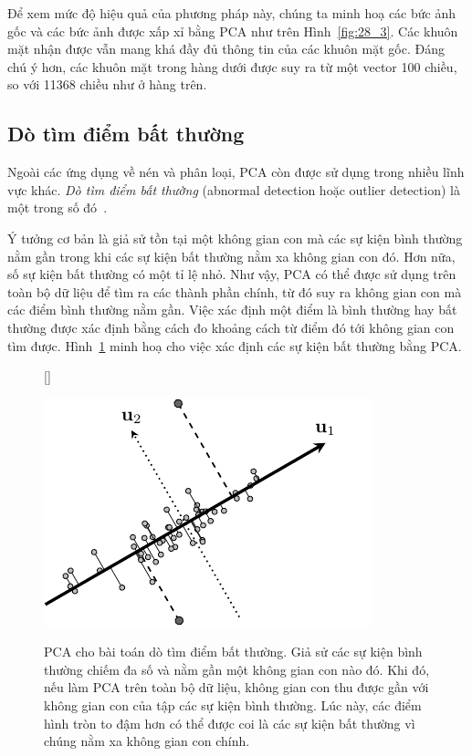 Để xem mức độ hiệu quả của phương pháp này, chúng ta  minh hoạ các bức ảnh gốc và các bức ảnh được xấp xỉ bằng PCA như trên
Hình~\ref{fig:28_3}. Các khuôn mặt nhận được vẫn mang khá đầy đủ thông tin của
các khuôn mặt gốc. Đáng chú ý hơn, các khuôn mặt trong hàng dưới được suy ra
từ một vector 100 chiều, so với 11368 chiều như ở hàng trên.





\subsection{Dò tìm điểm bất thường}
Ngoài các ứng dụng về nén và phân loại, PCA còn được sử dụng trong nhiều lĩnh
vực khác. \textit{Dò tìm điểm bất thường} (abnormal detection hoặc {outlier
    detection}) là một trong số đó~\cite{shyu2003novel,lakhina2004diagnosing}.

Ý tưởng cơ bản là giả sử tồn tại một không gian con mà các sự kiện bình thường
nằm gần trong khi các sự kiện bất thường nằm xa không gian con đó. Hơn nữa, số
sự kiện bất thường có một tỉ lệ nhỏ. Như vậy, PCA có thể được sử dụng trên toàn
bộ dữ liệu để tìm ra các thành phần chính, từ đó suy ra không gian con mà các điểm bình thường nằm gần.
Việc xác định một điểm là bình thường hay bất thường được xác định bằng cách đo
khoảng cách từ điểm đó tới không gian con tìm được. Hình~\ref{fig:28_4} minh hoạ
cho việc xác định các sự kiện bất thường bằng PCA.

\begin{figure}[t]

    [\FBwidth]
    {\caption{ PCA cho bài toán dò tìm điểm bất thường. Giả sử
    các sự kiện {bình thường} chiếm đa số và nằm gần  một không
    gian con nào đó. Khi đó, nếu làm PCA trên toàn bộ dữ liệu, không gian con
    thu được gần với không gian con của tập các sự kiện {bình thường}.
    Lúc này, các
    điểm hình tròn to đậm hơn có thể được coi là các sự kiện {bất thường} vì chúng nằm xa không gian con chính.}
    \label{fig:28_4}}
    { %
    \includegraphics[width=.45\textwidth]{Chapters/content/28_pca2/latex/abnormal.pdf}
    }
\end{figure}


